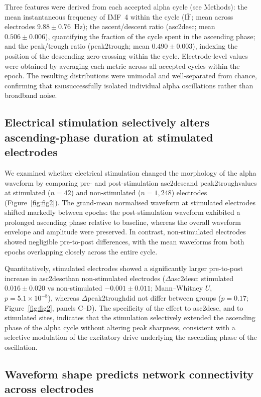\documentclass[11pt, a4paper]{article}
\newcommand{\emd}{\textsc{emd}}
\newcommand{\asc}{asc2desc}
\newcommand{\ptr}{peak2trough}
\begin{document}
Three features were derived from each accepted alpha cycle
(see Methods): the mean instantaneous frequency of IMF~4 within the cycle
($\overline{\text{IF}}$; mean across electrodes $9.88 \pm 0.76$~Hz); the
ascent/descent ratio (\asc; mean $0.506 \pm 0.006$), quantifying the fraction
of the cycle spent in the ascending phase; and the peak/trough ratio (\ptr;
mean $0.490 \pm 0.003$), indexing the position of the descending zero-crossing
within the cycle. Electrode-level values were obtained by averaging each metric
across all accepted cycles within the epoch. The resulting distributions were
unimodal and well-separated from chance, confirming that \emd successfully
isolated individual alpha oscillations rather than broadband noise.

\subsection{Electrical stimulation selectively alters ascending-phase duration
at stimulated electrodes}

We examined whether electrical stimulation changed the morphology of the alpha
waveform by comparing pre- and post-stimulation \asc and \ptr values at
stimulated ($n = 42$) and non-stimulated ($n = 1{,}248$) electrodes
(Figure~\ref{fig:fig2}). The grand-mean normalised waveform at stimulated
electrodes shifted markedly between epochs: the post-stimulation waveform
exhibited a prolonged ascending phase relative to baseline, whereas the overall
waveform envelope and amplitude were preserved. In contrast, non-stimulated
electrodes showed negligible pre-to-post differences, with the mean waveforms
from both epochs overlapping closely across the entire cycle.

Quantitatively, stimulated electrodes showed a significantly larger
pre-to-post increase in \asc than non-stimulated electrodes
($\Delta$\asc: stimulated $0.016 \pm 0.020$ vs non-stimulated
$-0.001 \pm 0.011$; Mann--Whitney $U$, $p = 5.1 \times 10^{-8}$), whereas
$\Delta$\ptr did not differ between groups ($p = 0.17$; Figure~\ref{fig:fig2},
panels C--D). The specificity of the effect to \asc, and to stimulated sites,
indicates that the stimulation selectively extended the ascending phase of the
alpha cycle without altering peak sharpness, consistent with a selective
modulation of the excitatory drive underlying the ascending phase of the
oscillation.

\subsection{Waveform shape predicts network connectivity across electrodes}
\end{document}
